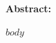 \documentclass[12pt]{article}
\renewenvironment{abstract}{\parindent=0pt\textbf{Abstract:}}{}
\begin{document}
\maketitle

\begin{abstract}
\lipsum[1-2]
\end{abstract}

\vspace{2em}

\tableofcontents


$body$
\end{document}
